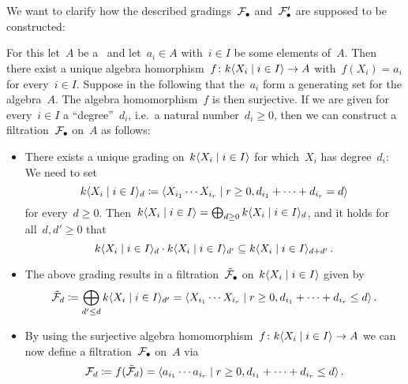 \section{}





\addtocounter{subsection}{1}





\subsection{}

We want to clarify how the described gradings~$\mathcal{F}_\bullet$ and~$\mathcal{F}'_\bullet$ are supposed to be constructed:

For this let~$A$ be a~{\kalg} and let~$a_i \in A$ with~$i \in I$ be some elements of~$A$.
Then there exist a unique algebra homorphism~$f \colon k\gen{X_i \suchthat i \in I} \to A$ with~$f(X_i) = a_i$ for every~$i \in I$.
Suppose in the following that the~$a_i$ form a generating set for the algebra~$A$.
The algebra homomorphism~$f$ is then surjective.
If we are given for every~$i \in I$ a \enquote{degree}~$d_i$, i.e.\ a natural number~$d_i \geq 0$, then we can construct a filtration~$\mathcal{F}_\bullet$ on~$A$ as follows:

\begin{itemize}
  \item
    There exists a unique grading on~$k\gen{X_i \suchthat i \in I}$ for which~$X_i$ has degree~$d_i$:
    We need to set
    \[
        k\gen{X_i \suchthat i \in I}_d
      \defined
        \gen{
          X_{i_1} \dotsm X_{i_r}
        \suchthat
          r \geq 0,
          d_{i_1} + \dotsb + d_{i_r} = d
        }
    \]
    for every~$d \geq 0$.
    Then~$k\gen{X_i \suchthat i \in I} = \bigoplus_{d \geq 0} k\gen{X_i \suchthat i \in I}_d$, and it holds for all~$d, d' \geq 0$ that
    \[
        k\gen{X_i \suchthat i \in I}_d
        \cdot
        k\gen{X_i \suchthat i \in I}_{d'}
      \subseteq
        k\gen{X_i \suchthat i \in I}_{d+d'} \,.
    \]
  \item
    The above grading results in a filtration~$\tilde{\mathcal{F}}_\bullet$ on~$k\gen{X_i \suchthat i \in I}$ given by
    \[
                \tilde{\Fcal}_d
      \defined  \bigoplus_{d' \leq d} k\gen{X_i \suchthat i \in I}_{d'}
      =         \gen{
                  X_{i_1} \dotsm X_{i_r}
                \suchthat
                  r \geq 0,
                  d_{i_1} + \dotsb + d_{i_r} \leq d
                }\,.
    \]
  \item
    By using the surjective algebra homomorphism~$f \colon k\gen{X_i \suchthat i \in I} \to A$ we can now define a filtration~$\mathcal{F}_\bullet$ on~$A$ via
    \[
                \Fcal_d
      \defined  f( \tilde{\Fcal}_d )
      =         \gen{
                  a_{i_1} \dotsm a_{i_r}
                \suchthat
                  r \geq 0,
                  d_{i_1} + \dotsb + d_{i_r} \leq d
                }
                \,.
    \]
\end{itemize}

